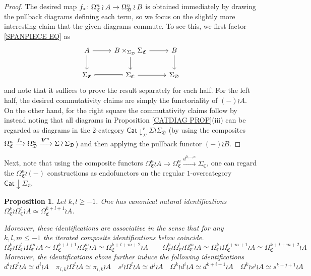 \documentclass[a4paper,10pt
,draft
]{article}%
\numberwithin{equation}{section}
\numberwithin{figure}{section}
\newtheorem{proposition}[equation]{Proposition}%
\theoremstyle{definition} %
\newcommand{\1}{\ensuremath{\mathbbm 1}}%
\begin{document}
\begin{proof}
The desired map 
$f_{\**} \colon
\Omega_{\mathfrak{C}}^n \wr A \to 
\Omega_{\mathfrak{D}}^n \wr B $
is obtained immediately by drawing the pullback diagrams defining each term, so we focus on the slightly more interesting claim that the given diagrams commute.
To see this, we first factor \eqref{SPANPIECE EQ} as
\[
\begin{tikzcd}
	A \ar{d} \ar{r} & B \times_{\Sigma_{\mathfrak{D}}} \Sigma_{\mathfrak{C}} \ar{r} \ar{d} &  \ar{d} B
\\
	\Sigma_{\mathfrak{C}} \ar[equal]{r} & \Sigma_{\mathfrak{C}} \ar{r} & \Sigma_{\mathfrak{D}}
\end{tikzcd}
\]
and note that it suffices to prove the result separately for each half.
For the left half, the desired commutativity claims are simply the functoriality of $(-) \wr A$. On the other hand, for the right square the commutativity claims follow by instead noting that all diagrams in 
Proposition \ref{CATDIAG PROP}(iii)
can be regarded as diagrams in the $2$-category
$\mathsf{Cat} \downarrow^r_{\Sigma} \Sigma \wr \Sigma_{\mathfrak{D}}$
(by using the composites 
$\Omega_{\mathfrak{C}}^n \xrightarrow{f_{\**}} \Omega_{\mathfrak{D}}^n \xrightarrow{\boldsymbol{V}^n} \Sigma \wr \Sigma_{\mathfrak{D}}$) 
and then applying the pullback functor $(-) \wr B$. 
\end{proof}



Next, note that using the composite functors 
$\Omega^n_{\mathfrak{C}} \wr A \to \Omega^n_{\mathfrak{C}} 
\xrightarrow{d^{0,\cdots,n}} \Sigma_{\mathfrak{C}}$,
one can regard the $\Omega_{\mathfrak{C}}^n \wr (-)$ constructions
as endofunctors on the regular $1$-overcategory
$\mathsf{Cat} \downarrow \Sigma_{\mathfrak{C}}$.


\begin{proposition}\label{ASSOCIDS PROP}
Let $k,l\geq -1$. One has canonical natural identifications 
$\Omega^k_{\mathfrak{C}} \wr \Omega^l_{\mathfrak{C}} \wr A
\simeq 
\Omega^{k+l+1}_{\mathfrak{C}} \wr A $.

Moreover, these identifications are associative in the sense that for any $k,l,m \leq -1$ the iterated composite identifications below coincide.
\[
\Omega^k_{\mathfrak{C}} \wr \Omega^l_{\mathfrak{C}} \wr \Omega^m_{\mathfrak{C}} \wr A
	\simeq 
\Omega^{k+l+1}_{\mathfrak{C}} \wr \Omega^m_{\mathfrak{C}} \wr A
	\simeq 
\Omega^{k+l+m+2}_{\mathfrak{C}} \wr A
\qquad
\Omega^k_{\mathfrak{C}} \wr \Omega^l_{\mathfrak{C}} \wr \Omega^m_{\mathfrak{C}} \wr A
	\simeq 
\Omega^{k}_{\mathfrak{C}} \wr \Omega^{l+m+1}_{\mathfrak{C}} \wr A
	\simeq 
\Omega^{k+l+m+2}_{\mathfrak{C}} \wr A
\]
Moreover, the identifications above further induce the following identifications
\[
d^i \wr \Omega^l \wr A \simeq d^i \wr A
	\quad
\pi_{i,k} \wr \Omega^l \wr A \simeq \pi_{i,k} \wr A
	\quad
s^j \wr \Omega^l \wr A \simeq d^j \wr A
	\quad
\Omega^k \wr d^i \wr A \simeq d^{k+i+1} \wr A
	\quad
\Omega^k \wr s^j \wr A \simeq s^{k+j+1} \wr A
\]
\end{proposition}
\end{document}
